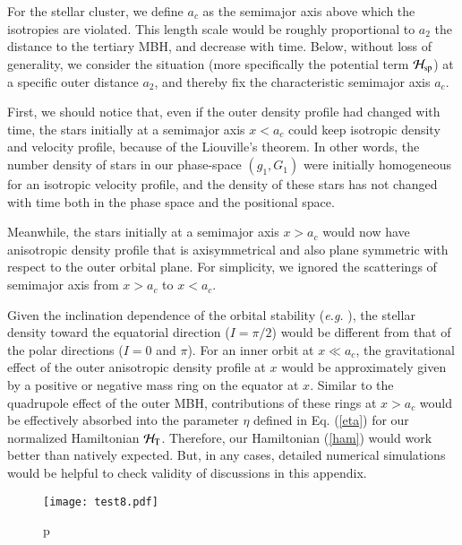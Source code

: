 \documentclass[useAMS,usenatbib,twocolumn]{mn2e}
\begin{document}
For the stellar cluster, we define $a_c$ as the semimajor axis above which the isotropies are violated. This length scale would be roughly proportional to $a_2$ the distance to the tertiary MBH,  and decrease with time.  Below, without loss of generality, we consider the situation (more specifically the potential term ${\cal H}_{\rm sp}$) at a specific outer distance $a_2$, and thereby fix the characteristic  semimajor axis $a_c$. 



First, we should notice that, even if the outer density profile had changed with time, the stars initially at a semimajor axis $x<a_c$ could keep isotropic density and velocity profile, because of the Liouville\rq{}s theorem.  In other words, the number density of stars in our phase-space $(g_1,G_1)$ were initially homogeneous for an isotropic velocity profile, and the density of these stars has not changed with time both in the phase space and the positional space.  

Meanwhile, the stars initially at a semimajor axis $x>a_c$ would now have anisotropic density profile that is axisymmetrical and also plane symmetric with respect to the outer orbital plane.  For simplicity, we ignored the scatterings of semimajor axis from $x>a_c$ to $x<a_c$.


Given the inclination dependence of the orbital stability ({\it e.g.} \citealt{eggleton1995}), the stellar density toward the equatorial direction ($I=\pi/2$) would be different from that of  the polar directions ($I=0$ and $\pi$).
For an inner orbit at $x\ll a_c$, the gravitational effect of the outer anisotropic density profile at $x$ would be approximately given by a positive or negative mass ring on the equator at $x$. Similar to the quadrupole effect of the outer MBH, contributions of these rings at $x>a_c$ would be effectively absorbed into the parameter $\eta$  defined in Eq. (\ref{eta}) for our normalized Hamiltonian ${\cal H}_{\rm T}$. Therefore, our Hamiltonian (\ref{ham}) would work better than natively expected. But, in any cases,  detailed numerical simulations would be helpful  to check validity of discussions in this appendix.  



\begin{figure}
\begin{center}
\texttt{[image: test8.pdf]}
\caption{p}
\label{fig:phase}
\end{center}
\end{figure}
\fi%
\end{document}

